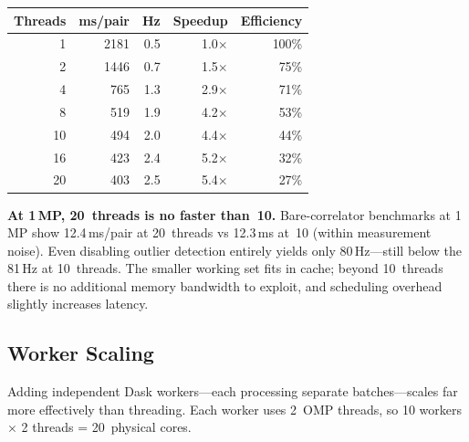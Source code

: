 \documentclass[10pt,a4paper,twocolumn]{article}
\begin{document}
\begin{center}
\small
\begin{tabular}{@{}rrrrr@{}}
\toprule
\textbf{Threads} & \textbf{ms/pair} & \textbf{Hz} & \textbf{Speedup} & \textbf{Efficiency} \\
\midrule
1  & 2181 & 0.5 & 1.0$\times$ & 100\% \\
2  & 1446 & 0.7 & 1.5$\times$ & 75\% \\
4  & 765  & 1.3 & 2.9$\times$ & 71\% \\
8  & 519  & 1.9 & 4.2$\times$ & 53\% \\
10 & 494  & 2.0 & 4.4$\times$ & 44\% \\
16 & 423  & 2.4 & 5.2$\times$ & 32\% \\
20 & 403  & 2.5 & 5.4$\times$ & 27\% \\
\bottomrule
\end{tabular}
\end{center}

\textbf{At 1\,MP, 20~threads is no faster than~10.} Bare-correlator benchmarks at 1\,MP show 12.4\,ms/pair at 20~threads vs 12.3\,ms at~10 (within measurement noise). Even disabling outlier detection entirely yields only 80\,Hz---still below the 81\,Hz at 10~threads. The smaller working set fits in cache; beyond 10~threads there is no additional memory bandwidth to exploit, and scheduling overhead slightly increases latency.

\subsection{Worker Scaling}

Adding independent Dask workers---each processing separate batches---scales far more effectively than threading. Each worker uses 2~OMP threads, so 10 workers $\times$ 2 threads = 20~physical cores.
\end{document}
